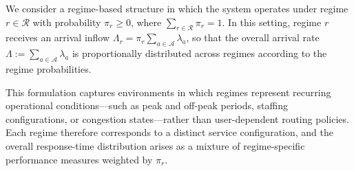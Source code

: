 \documentclass[letter,11pt, reqno]{amsart}
\def\A{\mathcal{A}}
\def\RR{\mathcal{R}}
\begin{document}
We consider a regime-based structure in which the system operates under regime 
$r \in \mathcal R$ with probability $\pi_r \ge 0$, where 
$\sum_{r\in\mathcal R} \pi_r = 1$. In this setting, regime $r$ receives an arrival inflow $\Lambda_r = \pi_r \sum_{a\in\mathcal A} \lambda_a$, so that the overall arrival rate $\Lambda := \sum_{a\in\mathcal A} \lambda_a$ 
is proportionally distributed across regimes according to the regime probabilities. 

This formulation captures environments in which regimes represent recurring  operational conditions—such as peak and off-peak periods, staffing configurations, or congestion states—rather than user-dependent routing policies. Each regime 
therefore corresponds to a distinct service configuration, and the overall  response-time distribution arises as a mixture of regime-specific performance  measures weighted by $\pi_r$.

\end{document}
